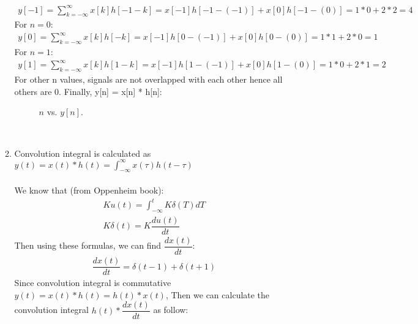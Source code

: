 \documentclass[10pt,a4paper, margin=1in]{article}
\begin{document}
\begin{enumerate}
\begin{enumerate}
\begin{gather*}
    y[-1] = \sum^{\infty}_{k=-\infty}x[k]h[-1-k] = x[-1]h[-1-(-1)] + x[0]h[-1-(0)] = 1*0+2*2 = 4
\end{gather*}
For $n=0$:
\begin{gather*}
    y[0] = \sum^{\infty}_{k=-\infty}x[k]h[-k] = x[-1]h[0-(-1)] + x[0]h[0-(0)] = 1*1+2*0 = 1
\end{gather*}
For $n=1$:
\begin{gather*}
    y[1] = \sum^{\infty}_{k=-\infty}x[k]h[1-k] = x[-1]h[1-(-1)] + x[0]h[1-(0)] = 1*0+2*1 = 2
\end{gather*}
For other n values, signals are not overlapped with each other hence all others are 0. Finally, y[n] = x[n] * h[n]:
\begin{figure} [ht!]
    \centering
    \caption{$n$ vs. $y[n]$.}
    \label{fig:q3}
\end{figure}
\\
    \item %
        Convolution integral is calculated as $y(t)=x(t)*h(t) = \int_{-\infty}^\infty x(\tau)h(t-\tau)$ \\ \\
        We know that (from Oppenheim book):
    \begin{gather*}
        Ku(t) = \int_{-\infty}^{t} K\delta(T) dT \\
        K\delta(t)=K\dfrac{du(t)}{dt}
    \end{gather*}
    Then using these formulas, we can find $\dfrac{dx(t)}{dt}$:
    \begin{gather*}
        \dfrac{dx(t)}{dt} = \delta(t-1)+\delta(t+1)
    \end{gather*}
    Since convolution integral is commutative  $y(t)=x(t)*h(t)=h(t)*x(t)$, Then we can calculate the convolution integral $h(t)*\dfrac{dx(t)}{dt}$ as follow:

\end{enumerate}
\end{enumerate}
\end{document}

